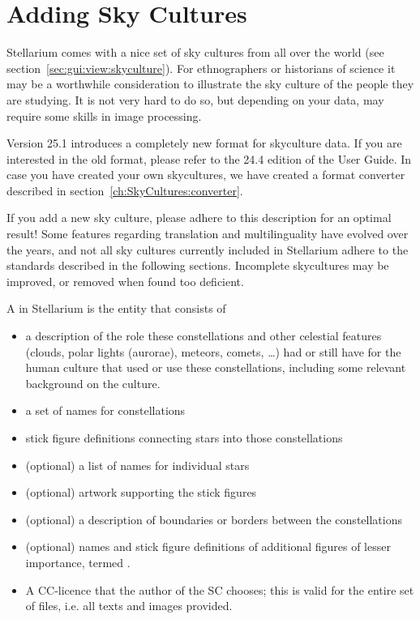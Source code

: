 

\chapter{Adding Sky Cultures}
\label{ch:SkyCultures}


Stellarium comes with a nice set of sky cultures from all
over the world (see section~\ref{sec:gui:view:skyculture}). For ethnographers or
historians of science it may be a worthwhile consideration to
illustrate the sky culture of the people they are studying. It is not
very hard to do so, but depending on your data, may require some
skills in image processing.

Version 25.1 introduces a completely new format for skyculture data. 
If you are interested in the old format, please refer to the 24.4 edition of the User Guide.
In case you have created your own skycultures, we have created a format converter  described in section~\ref{ch:SkyCultures:converter}.


If you add a new sky culture, please adhere to this description for an optimal result!
Some features regarding translation and multilinguality have evolved
over the years, and not all sky cultures currently included in
Stellarium adhere to the standards described in the following
sections. Incomplete skycultures may be improved, or removed when found too deficient.



A  in Stellarium is the entity that consists of 
\begin{itemize}
\item a description of the role these constellations and other celestial features (clouds, polar lights (aurorae), meteors, comets, \ldots) 
      had or still have for the human culture that used or use these constellations, including some relevant background on the culture.
\item a set of names for constellations 
\item stick figure definitions connecting stars into those constellations
\item (optional) a list of names for individual stars
\item (optional) artwork supporting the stick figures
\item (optional) a description of boundaries or borders between the constellations
\item (optional) names and stick figure definitions of additional figures of lesser importance, termed .
\item A CC-licence that the author of the SC chooses; this is valid for the entire set of files, i.e. all texts and images provided.
\end{itemize}




